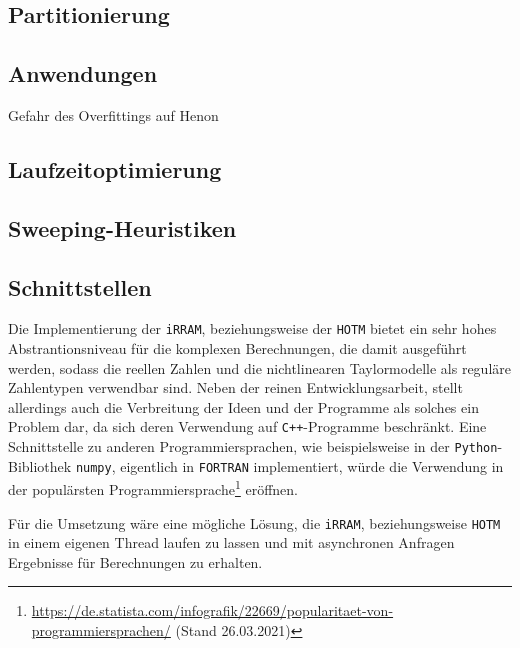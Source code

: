 \subsection{Partitionierung}


\subsection{Anwendungen}
Gefahr des Overfittings auf Henon




\subsection{Laufzeitoptimierung}

\subsection{Sweeping-Heuristiken}

\subsection{Schnittstellen}
Die Implementierung der \verb+iRRAM+, beziehungsweise der \verb+HOTM+ bietet ein sehr hohes Abstrantionsniveau für die komplexen Berechnungen, die damit ausgeführt werden, sodass die reellen Zahlen und die nichtlinearen Taylormodelle als reguläre Zahlentypen verwendbar sind. Neben der reinen Entwicklungsarbeit, stellt allerdings auch die Verbreitung der Ideen und der Programme als solches ein Problem dar, da sich deren Verwendung auf \verb.C++.-Programme beschränkt. Eine Schnittstelle zu anderen Programmiersprachen, wie beispielsweise in der \verb+Python+-Bibliothek \verb+numpy+, eigentlich in \verb+FORTRAN+ implementiert, würde die Verwendung in der populärsten Programmiersprache\footnote{\url{https://de.statista.com/infografik/22669/popularitaet-von-programmiersprachen/} (Stand 26.03.2021)} eröffnen.


Für die Umsetzung wäre eine mögliche Lösung, die \verb+iRRAM+, beziehungsweise \verb+HOTM+ in einem eigenen Thread laufen zu lassen und mit asynchronen Anfragen Ergebnisse für Berechnungen zu erhalten.

